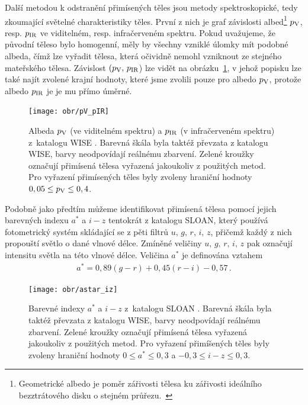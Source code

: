 \documentclass[A4paper, 12pt, oneside]{book}
\begin{document}
Další metodou k odstranění přimísených těles jsou metody spektroskopické, tedy zkoumající světelné charakteristiky těles. První z nich je graf závislosti albed\footnote{Geometrické albedo je poměr zářivosti tělesa ku zářivosti ideálního bezztrátového disku o stejném průřezu.~\cite{fmt}} $p_{\rm V}$, resp. $p_{\rm IR}$ ve viditelném, resp. infračerveném spektru. Pokud uvažujeme, že původní těleso bylo homogenní, měly by všechny vzniklé úlomky mít podobné albeda, čímž lze vyřadit tělesa, která očividně nemohl vzniknout ze stejného mateřského tělesa. Závislost $(p_{\rm V},\,p_{\rm IR}$) lze vidět na obrázku~\ref{fig:pV_pIR}, v jehož popisku lze také najít zvolené krajní hodnoty, které jsme zvolili pouze pro albedo $p_{\rm V}$, protože albedo $p_{\rm IR}$ je je mu přímo úměrné.

\begin{figure}
	\centering
	\texttt{[image: obr/pV\_pIR]}
	\caption{Albeda $p_{\rm V}$ (ve viditelném spektru) a $p_{\rm IR}$ (v infračerveném spektru) z~katalogu WISE \cite{nugent15}. Barevná škála byla taktéž převzata z katalogu WISE, barvy neodpovídají reálnému zbarvení. Zelené kroužky označují přimísená tělesa vyřazená jakoukoliv z použitých metod. Pro vyřazení přimísených těles byly zvoleny hraniční hodnoty $0,05 \leq p_{\rm V} \leq 0,4$.}
	\label{fig:pV_pIR}
\end{figure}

Podobně jako předtím můžeme identifikovat přimísená tělesa pomocí jejich barevných indexu $a^*$ a $i-z$ tentokrát z katalogu SLOAN, který používá fotometrický systém skládající se z pěti filtrů $u,\,g,\,r,\,i,\,z$, přičemž každý z nich propouští světlo o dané vlnové délce. Zmíněné veličiny 
$u,\,g,\,r,\,i,\,z$ pak označují intensitu světla na této vlnové délce. Veličina $a^*$ je definována vztahem
\begin{align}
	a^ *= 0,89 (g - r) + 0,45 (r - i) - 0,57\,.
\end{align}
\begin{figure}
	\centering
	\texttt{[image: obr/astar\_iz]}
	\caption{Barevné indexy $a^*$ a $i-z$ z~katalogu SLOAN \cite{ivezic01}. Barevná škála byla taktéž převzata z katalogu WISE, barvy neodpovídají reálnému zbarvení. Zelené kroužky označují přimísená tělesa vyřazená jakoukoliv z použitých metod. Pro vyřazení přimíšených těles byly zvoleny hraniční hodnoty $0\leq a^* \leq 0,3$ a $-0,3\leq i-z \leq 0,3$.}
	\label{fig:astar_iz}
\end{figure}

\pagebreak
\end{document}
